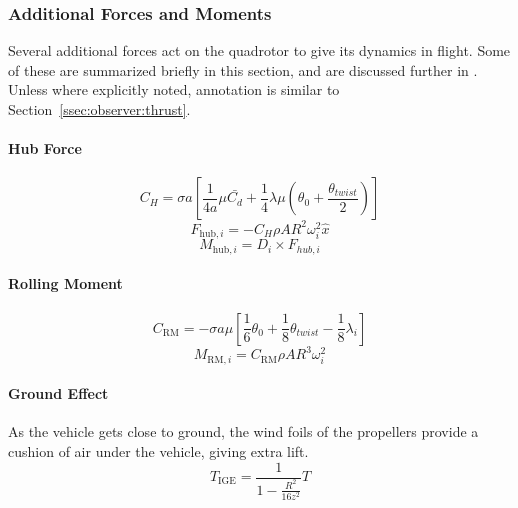 \subsubsection{Additional Forces and Moments}
\label{ssec:observer:additionalforces}
    Several additional forces act on the quadrotor to give its dynamics in flight.
    Some of these are summarized briefly in this section, and are discussed further in \citep{bouabdallah07full}.
    Unless where explicitly noted, annotation is similar to Section~\ref{ssec:observer:thrust}.
    \paragraph{Hub Force}
        \begin{equation}
            C_{H} = \sigma a \left[
                \frac{1}{4a}\mu\bar{C_{d}}
                + \frac{1}{4}\lambda\mu\left( \theta_{0} + \frac{\theta_{twist}}{2} \right)
                \right]
        \end{equation}
        \begin{equation}
            F_{\text{hub},i} = -C_{H} \rho A R^{2} \omega_{i}^{2}\hat{x}
        \end{equation}
        \begin{equation}
            M_{\text{hub},i} = D_{i} \times F_{hub,i}
        \end{equation}

    \paragraph{Rolling Moment}
        \begin{equation}
            C_{\text{RM}} = - \sigma a \mu \left[
                \frac{1}{6}\theta_{0}
                + \frac{1}{8}\theta_{twist}
                - \frac{1}{8}\lambda_{i}
                \right]
        \end{equation}
        \begin{equation}
            M_{\text{RM},i} = C_{\text{RM}} \rho A R^{3} \omega_{i}^{2}
        \end{equation}

    \paragraph{Ground Effect}
        As the vehicle gets close to ground, the wind foils of the propellers
        provide a cushion of air under the vehicle, giving extra lift.
        \begin{equation}
            T_{\text{IGE}} = \frac{1}{1-\frac{R^{2}}{16z^{2}}} T
        \end{equation}

